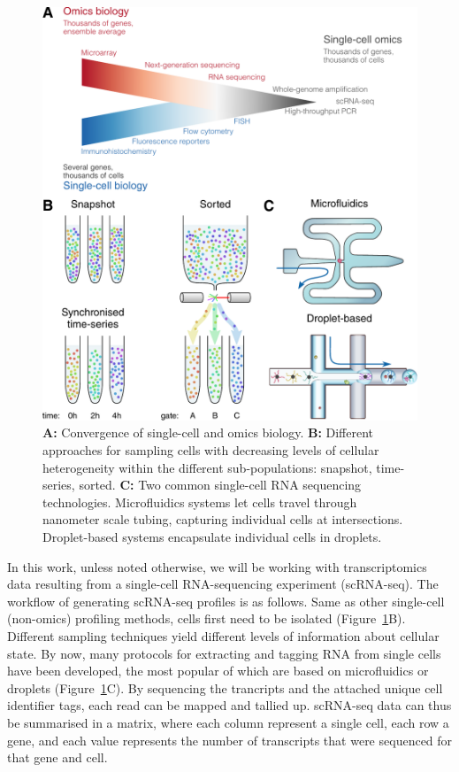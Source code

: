 \begin{figure}[htb!]
	\centering
	\includegraphics[width=.7\linewidth]{fig/singlecell_omics_methodology} 
	\caption{
		\textbf{A:} Convergence of single-cell and omics biology\cite{junker_everycellspecial_2014}.
		\textbf{B:} Different approaches for sampling cells with decreasing levels of cellular heterogeneity within the different sub-populations: snapshot, time-series, sorted.
		\textbf{C:} Two common single-cell RNA sequencing technologies. Microfluidics systems let cells travel through nanometer scale tubing, capturing individual cells at intersections. Droplet-based systems encapsulate individual cells in droplets.
	}
	\label{fig:profiling_convergence}
\end{figure}


In this work, unless noted otherwise, we will be working with transcriptomics data resulting from a single-cell RNA-sequencing experiment (scRNA-seq). The workflow of generating scRNA-seq profiles is as follows. Same as other single-cell (non-omics) profiling methods, cells first need to be isolated (Figure~\ref{fig:profiling_convergence}B). Different sampling techniques yield different levels of information about cellular state. By now, many protocols for extracting and tagging RNA from single cells have been developed\cite{svensson_exponentialscalingsinglecell_2018}, the most popular of which are based on microfluidics or droplets (Figure~\ref{fig:profiling_convergence}C). By sequencing the trancripts and the attached unique cell identifier tags, each read can be mapped and tallied up. scRNA-seq data can thus be summarised in a matrix, where each column represent a single cell, each row a gene, and each value represents the number of transcripts that were sequenced for that gene and cell.

